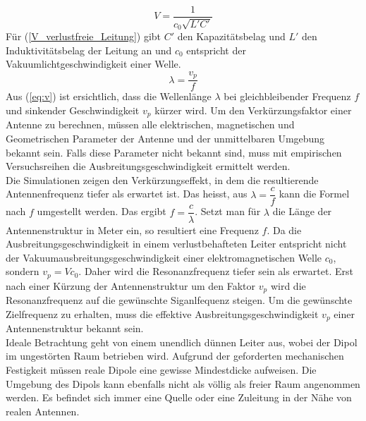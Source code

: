 \begin{equation}\label{V_verlustfreie_Leitung}
V=\dfrac{1}{c_0 \sqrt{L'C'}} 
\end{equation}
Für (\ref{V_verlustfreie_Leitung}) gibt $C'$  den Kapazitätsbelag und $L'$ den Induktivitätsbelag  der Leitung an und $c_0$ entspricht der Vakuumlichtgeschwindigkeit einer Welle.
\begin{equation}\label{eq:v}
\lambda=\dfrac{v_p}{f}
\end{equation}  
Aus (\ref{eq:v})  ist ersichtlich, dass die Wellenlänge $\lambda$ bei gleichbleibender Frequenz $f$ und sinkender Geschwindigkeit $v_p$ kürzer wird. 
Um den Verkürzungsfaktor einer Antenne zu berechnen, müssen alle elektrischen, magnetischen und Geometrischen Parameter der Antenne und der unmittelbaren Umgebung bekannt sein. Falls diese Parameter  nicht bekannt sind, muss mit empirischen Versuchsreihen die Ausbreitungsgeschwindigkeit ermittelt werden.\\

\newpage
Die Simulationen zeigen den Verkürzungseffekt, in dem die resultierende Antennenfrequenz tiefer als erwartet ist. Das heisst, aus $\lambda = \dfrac{c}{f}$ kann die Formel nach $f$ umgestellt werden. Das ergibt $f=\dfrac{c}{\lambda}$. Setzt man für $\lambda$ die Länge der Antennenstruktur in Meter ein, so resultiert eine Frequenz $f$. Da die Ausbreitungsgeschwindigkeit in einem verlustbehafteten Leiter entspricht nicht der Vakuumausbreitungsgeschwindigkeit einer elektromagnetischen Welle $c_0$, sondern $v_p=V c_0$. Daher  wird die Resonanzfrequenz tiefer sein als erwartet. Erst nach einer Kürzung der Antennenstruktur um den Faktor $v_p$ wird die Resonanzfrequenz auf die gewünschte Siganlfequenz steigen. Um die gewünschte Zielfrequenz zu erhalten, muss die effektive Ausbreitungsgeschwindigkeit $v_p$ einer Antennenstruktur bekannt sein.\\

Ideale Betrachtung geht von einem unendlich dünnen Leiter aus, wobei der Dipol im ungestörten Raum betrieben wird. Aufgrund der geforderten mechanischen Festigkeit müssen reale Dipole eine gewisse Mindestdicke aufweisen. Die Umgebung des Dipols kann ebenfalls nicht als völlig als freier Raum angenommen werden. Es befindet sich immer eine Quelle oder eine Zuleitung in der Nähe von realen Antennen. \\

